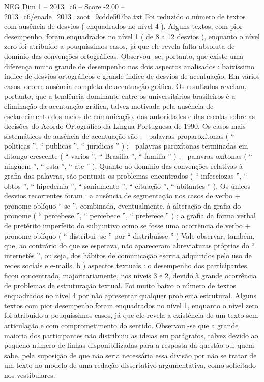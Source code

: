 \begin{textsample}{NEG Dim 1 – 2013\_c6 – Score -2.00 – 2013\_c6/enade\_2013\_zoot\_9cdde507ba.txt}
Foi reduzido o número de textos com ausência de desvios ( enquadrados no nível 4 ).
Alguns textos, com pior desempenho, foram enquadrados no nível 1 ( de 8 a 12 desvios ), enquanto o nível zero foi atribuído a pouquíssimos casos, já que ele revela falta absoluta de domínio das convenções ortográficas.
Observou -se, portanto, que existe uma diferença muito grande de desempenho nos dois aspectos analisados : baixíssimo índice de desvios ortográficos e grande índice de desvios de acentuação.
Em vários casos, ocorre ausência completa de acentuação gráfica.
Os resultados revelam, portanto, que a tendência dominante entre os universitários brasileiros é a eliminação da acentuação gráfica, talvez motivada pela ausência de esclarecimento dos meios de comunicação, das autoridades e das escolas sobre as decisões do Acordo Ortográfico da Língua Portuguesa de 1990.
Os casos mais sistemáticos de ausência de acentuação são :  palavras proparoxítonas ( “ politicas ”, “ publicas ”, “ juridicas ” ) ;  palavras paroxítonas terminadas em ditongo crescente ( “ varios ”, “ Brasilia ”, “ familia ” ) ;  palavras oxítonas ( “ ninguem ”, “ esta ”, “ ate ” ).
Quanto ao domínio das convenções relativas à grafia das palavras, são pontuais os problemas encontrados ( “ infecciozas ”, “ obtos ”, “ hipedemia ”, “ saniamento ”, “ cituação ”, “ abitantes ” ).
Os únicos desvios recorrentes foram : a ausência de segmentação nos casos de verbo + pronome oblíquo “ se ”, combinada, eventualmente, à alteração da grafia do pronome ( “ percebese ”, “ percebece ”, “ preferece ” ) ; a grafia da forma verbal de pretérito imperfeito do subjuntivo como se fosse uma ocorrência de verbo + pronome oblíquo ( “ distribui -se ” por “ distribuísse ” ) Vale observar, também, que, ao contrário do que se esperava, não apareceram abreviaturas próprias do “ internetês ”, ou seja, dos hábitos de comunicação escrita adquiridos pelo uso de redes sociais e e-mails. b ) aspectos textuais : o desempenho dos participantes ficou concentrado, majoritariamente, nos níveis 3 e 2, devido à grande ocorrência de problemas de estruturação textual.
Foi muito baixo o número de textos enquadrados no nível 4 por não apresentar qualquer problema estrutural.
Alguns textos com pior desempenho foram enquadrados no nível 1, enquanto o nível zero foi atribuído a pouquíssimos casos, já que ele revela a existência de um texto sem articulação e com comprometimento do sentido.
Observou -se que a grande maioria dos participantes não distribuiu as ideias em parágrafos, talvez devido ao pequeno número de linhas disponibilizadas para a resposta da questão ou, quem sabe, pela suposição de que não seria necessária essa divisão por não se tratar de um texto no modelo de uma redação dissertativo-argumentativa, como solicitado nos vestibulares.

\end{textsample}

